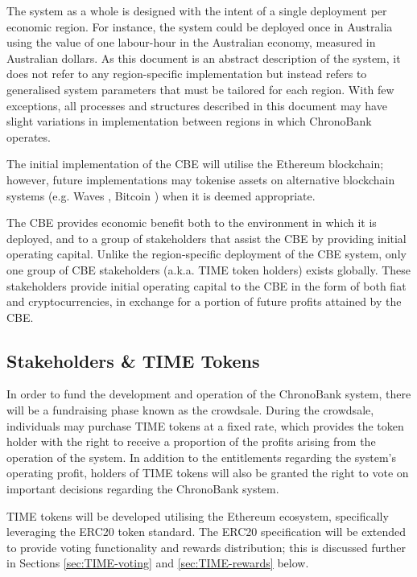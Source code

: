 \begin{multicols}{2}
The system as a whole is designed with the intent of a single deployment per economic region. For instance, the system could be deployed once in Australia using the value of one labour-hour in the Australian economy, measured in Australian dollars. As this document is an abstract description of the system, it does not refer to any region-specific implementation but instead refers to generalised system parameters that must be tailored for each region. With few exceptions, all processes and structures described in this document may have slight variations in implementation between regions in which ChronoBank operates. 

The initial implementation of the CBE will utilise the Ethereum\cite{Wood2014} blockchain; however, future implementations may tokenise assets on alternative blockchain systems (e.g. Waves \cite{Ivanov2016}, Bitcoin \cite{Nakamoto2008}) when it is deemed appropriate.

The CBE provides economic benefit both to the environment in which it is deployed, and to a group of stakeholders that assist the CBE by providing initial operating capital. Unlike the region-specific deployment of the CBE system, only one group of CBE stakeholders (a.k.a. TIME token holders) exists globally. These stakeholders provide initial operating capital to the CBE in the form of both fiat and cryptocurrencies, in exchange for a portion of future profits attained by the CBE.


\subsection{Stakeholders \& TIME Tokens}
\label{sec:TIME-tokens}

In order to fund the development and operation of the ChronoBank system, there will be a fundraising phase known as the crowdsale. During the crowdsale, individuals may purchase TIME tokens at a fixed rate, which provides the token holder with the right to receive a proportion of the profits arising from the operation of the system. In addition to the entitlements regarding the system's operating profit, holders of TIME tokens will also be granted the right to vote on important decisions regarding the ChronoBank system.

TIME tokens will be developed utilising the Ethereum ecosystem, specifically leveraging the ERC20 token standard\cite{ERC20}. The ERC20 specification will be extended to provide voting functionality and rewards distribution; this is discussed further in Sections \ref{sec:TIME-voting} and \ref{sec:TIME-rewards} below.


\end{multicols}
